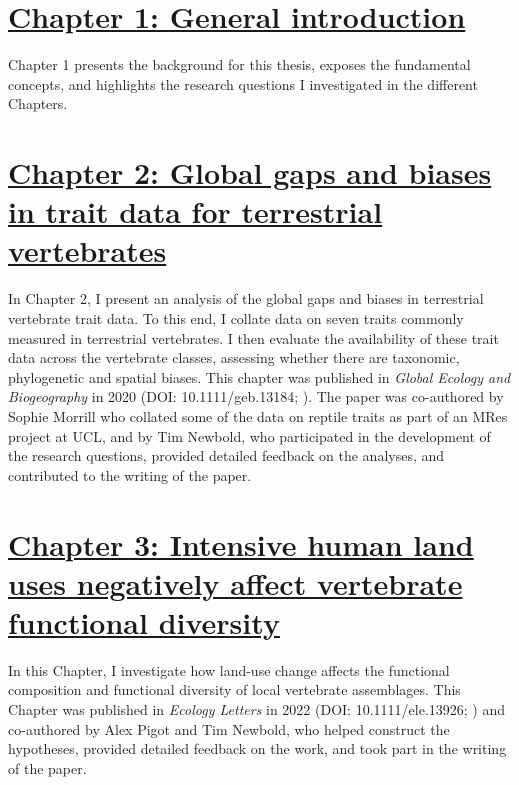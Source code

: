 
\section*{\hyperref[sec:1]{Chapter 1: General introduction}}
Chapter 1 presents the background for this thesis, exposes the fundamental concepts, and highlights the research questions I investigated in the different Chapters.

\section*{\hyperref[sec:2]{Chapter 2: Global gaps and biases in trait data for terrestrial vertebrates}}
In Chapter 2, I present an analysis of the global gaps and biases in terrestrial vertebrate trait data. To this end, I collate data on seven traits commonly measured in terrestrial vertebrates. I then evaluate the availability of these trait data across the vertebrate classes, assessing whether there are taxonomic, phylogenetic and spatial biases. This chapter was published in \textit{Global Ecology and Biogeography} in 2020 (DOI: 10.1111/geb.13184; \citet{Etard2020}). The paper was co-authored by Sophie Morrill who collated some of the data on reptile traits as part of an MRes project at UCL, and by Tim Newbold, who participated in the development of the research questions, provided detailed feedback on the analyses, and contributed to the writing of the paper. 

\section*{\hyperref[sec:3]{Chapter 3: Intensive human land uses negatively affect vertebrate functional diversity}}
In this Chapter, I investigate how land-use change affects the functional composition and functional diversity  of local vertebrate assemblages. This Chapter was published in \textit{Ecology Letters} in 2022  (DOI: 10.1111/ele.13926; \citet{Etard2022}) and co-authored by Alex Pigot and Tim Newbold, who helped construct the hypotheses, provided detailed feedback on the work, and took part in the writing of the paper.

